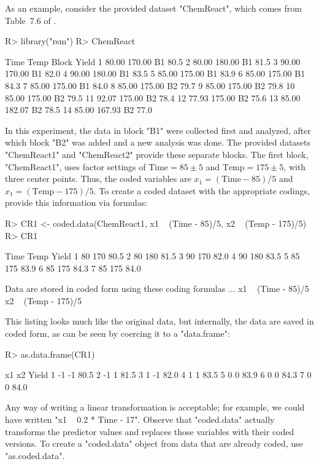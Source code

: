\documentclass[article,nojss]{jss}
\begin{document}
As an example, consider the provided dataset "ChemReact", which comes from Table~7.6 of \cite{Mye09}.
\begin{Schunk}
\begin{Sinput}
R> library("rsm")
R> ChemReact
\end{Sinput}
\begin{Soutput}
    Time   Temp Block Yield
1  80.00 170.00    B1  80.5
2  80.00 180.00    B1  81.5
3  90.00 170.00    B1  82.0
4  90.00 180.00    B1  83.5
5  85.00 175.00    B1  83.9
6  85.00 175.00    B1  84.3
7  85.00 175.00    B1  84.0
8  85.00 175.00    B2  79.7
9  85.00 175.00    B2  79.8
10 85.00 175.00    B2  79.5
11 92.07 175.00    B2  78.4
12 77.93 175.00    B2  75.6
13 85.00 182.07    B2  78.5
14 85.00 167.93    B2  77.0
\end{Soutput}
\end{Schunk}
In this experiment, the data in block "B1" were collected first and analyzed, after which block "B2" was added and a new analysis was done. The provided datasets "ChemReact1" and "ChemReact2" provide these separate blocks. 
The first block, "ChemReact1", uses factor settings of $\text{Time}=85\pm5$ and $\text{Temp}=175\pm5$, with three center points.  Thus, the coded variables are $x_1 = (\text{Time}-85)/5$ and $x_1 = (\text{Temp}-175)/5$.  To create a coded dataset with the appropriate codings, provide this information via formulas:
\begin{Schunk}
\begin{Sinput}
R> CR1 <- coded.data(ChemReact1, x1 ~ (Time - 85)/5, x2 ~ (Temp - 175)/5)
R> CR1
\end{Sinput}
\begin{Soutput}
  Time Temp Yield
1   80  170  80.5
2   80  180  81.5
3   90  170  82.0
4   90  180  83.5
5   85  175  83.9
6   85  175  84.3
7   85  175  84.0

Data are stored in coded form using these coding formulas ...
x1 ~ (Time - 85)/5
x2 ~ (Temp - 175)/5
\end{Soutput}
\end{Schunk}
This listing looks much like the original data, but internally, the data are saved in coded form, as can be seen by coercing it to a "data.frame":
\begin{Schunk}
\begin{Sinput}
R> as.data.frame(CR1)
\end{Sinput}
\begin{Soutput}
  x1 x2 Yield
1 -1 -1  80.5
2 -1  1  81.5
3  1 -1  82.0
4  1  1  83.5
5  0  0  83.9
6  0  0  84.3
7  0  0  84.0
\end{Soutput}
\end{Schunk}
Any way of writing a linear transformation is acceptable; for example, we could have written "x1 ~ 0.2 * Time - 17".
Observe that "coded.data" actually transforms the predictor values and replaces those variables with their coded versions.  To create a "coded.data" object from data that are already coded, use "as.coded.data".
\end{document}
